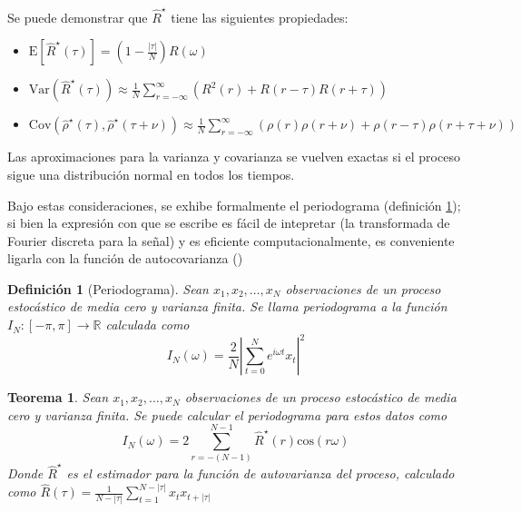 \documentclass[12pt,a4paper]{mitthesis}
\newtheorem{defn}{Definici\'on}
\newtheorem{thrm}{Teorema}
\newcommand{\R}{\mathbb{R}}
\newcommand{\aste}[1]{\widehat{ #1 }^{\star}}
\newcommand{\COS}[1]{\mathrm{cos}\left( #1 \right)}
\newcommand{\E}[1]{\mathrm{E}\left[ #1 \right]}
\newcommand{\Var}[1]{\mathrm{Var}\left( #1 \right)}
\newcommand{\Cov}[1]{\mathrm{Cov}\left( #1 \right)}
\newcommand{\abso}[1]{\left| #1 \right|}
\begin{document}
Se puede demonstrar que $\aste{R}$ tiene las siguientes 
propiedades:
\begin{itemize}
\item $\E{\aste{R}(\tau)} = \left(1 - \frac{\abso{\tau}}{N} \right) R(\omega)$
\item $\Var{\aste{R}(\tau)} \approx \frac{1}{N} 
\sum_{r=-\infty}^{\infty} \left( R^{2}(r) + R(r-\tau)R(r+\tau) \right)$
\item $\Cov{\aste{\rho}(\tau),\aste{\rho}(\tau+\nu)} \approx \frac{1}{N} 
\sum_{r=-\infty}^{\infty} \left( \rho(r)\rho(r+\nu) + \rho(r-\tau)\rho(r+\tau+\nu) \right)$
\end{itemize}
Las aproximaciones para la varianza y covarianza se vuelven exactas si el proceso sigue una 
distribuci\'on normal en todos los tiempos.


Bajo estas consideraciones, se exhibe formalmente el periodograma (definici\'on 
\ref{periodograma}); si bien la expresi\'on con que se escribe es f\'acil de intepretar (la 
transformada de Fourier discreta para la se\~nal) y es eficiente computacionalmente, es conveniente
ligarla con la funci\'on de autocovarianza ()

\begin{defn}[Periodograma]
Sean $x_1, x_2 , \dots, x_N$ observaciones de un proceso estoc\'astico de media cero y varianza
finita. Se llama periodograma a la funci\'on $I_N: [-\pi,\pi] \rightarrow \R$ calculada como
\begin{equation*}
I_N(\omega) = \frac{2}{N} \abso{ \sum_{t=0}^{N} e^{i \omega t} x_t }^{2}
\end{equation*}
\label{periodograma}
\end{defn}

\begin{thrm}
Sean $x_1, x_2 , \dots, x_N$ observaciones de un proceso estoc\'astico de media cero y varianza
finita. Se puede calcular el periodograma para estos datos como
\begin{equation*}
I_N(\omega) = 2 \sum_{r = -(N-1)}^{N-1} \aste{R}(r) \COS{r \omega}
\end{equation*}
Donde $\aste{R}$ es el estimador para la funci\'on de autovarianza del proceso, calculado como
$\widehat{R}(\tau) = \frac{1}{N-\abso{\tau}} \sum_{t = 1}^{N-\abso{\tau}} x_t x_{t+\abso{\tau}}$
\label{periodograma_rho}
\end{thrm}
\end{document}
